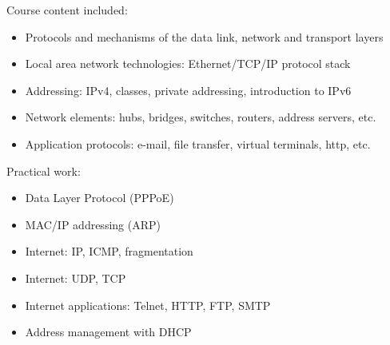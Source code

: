 Course content included:
\begin{itemize}
    \item Protocols and mechanisms of the data link, network and transport layers
    \item Local area network technologies: Ethernet/TCP/IP protocol stack
    \item Addressing: IPv4, classes, private addressing, introduction to IPv6
    \item Network elements: hubs, bridges, switches, routers, address servers, etc.
    \item Application protocols: e-mail, file transfer, virtual terminals, http, etc.
\end{itemize}
Practical work:
\begin{itemize}
    \item Data Layer Protocol (PPPoE)
    \item MAC/IP addressing (ARP)
    \item Internet: IP, ICMP, fragmentation
    \item Internet: UDP, TCP
    \item Internet applications: Telnet, HTTP, FTP, SMTP
    \item Address management with DHCP
\end{itemize}